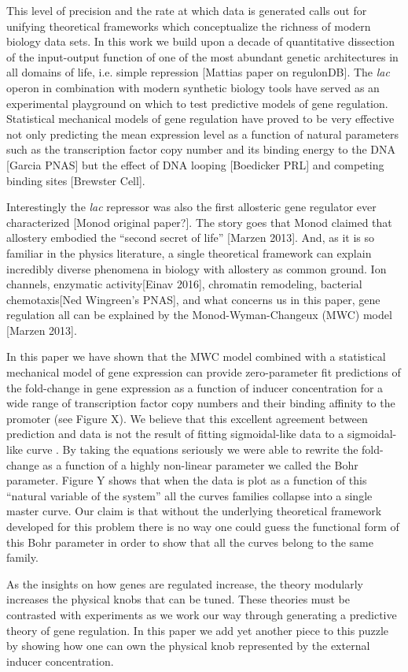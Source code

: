 This level of precision and the rate at which data is generated calls out for
unifying theoretical frameworks which conceptualize the richness of modern
biology data sets. In this work we build upon a decade of quantitative
dissection of the input-output function of one of the most abundant genetic
architectures in all domains of life, i.e. simple repression [Mattias paper on
regulonDB]. The \textit{lac} operon in combination with modern synthetic biology
tools have served as an experimental playground on which to test predictive
models of gene regulation. Statistical mechanical models of gene regulation have
proved to be very effective not only predicting the mean expression level as a
function of natural parameters such as the transcription factor copy number and
its binding energy to the DNA [Garcia PNAS] but the effect of DNA looping
[Boedicker PRL] and competing binding sites [Brewster Cell].

Interestingly the \textit{lac} repressor was also the first allosteric gene
regulator ever characterized [Monod original paper?]. The story goes that Monod
claimed that allostery embodied the ``second secret of life'' [Marzen 2013].
And, as it is so familiar in the physics literature, a single theoretical
framework can explain incredibly diverse phenomena in biology with allostery as
common ground. Ion channels, enzymatic activity[Einav 2016], chromatin
remodeling, bacterial chemotaxis[Ned Wingreen's PNAS], and what concerns us in
this paper, gene regulation all can be explained by the Monod-Wyman-Changeux
(MWC) model [Marzen 2013]. 

In this paper we have shown that the MWC model combined with a statistical
mechanical model of gene expression can provide zero-parameter fit predictions
of the fold-change in gene expression as a function of inducer concentration for
a wide range of transcription factor copy numbers and their binding affinity to
the promoter (see Figure X). We believe that this excellent agreement between
prediction and data is not the result of fitting sigmoidal-like data to a
sigmoidal-like curve . By taking the equations seriously we were able to rewrite
the fold-change as a function of a highly non-linear parameter we called the
Bohr parameter. Figure Y shows that when the data is plot as a function of this
``natural variable of the system'' all the curves families collapse into a
single master curve. Our claim is that without the underlying theoretical
framework developed for this problem there is no way one could guess the
functional form of this Bohr parameter in order to show that all the curves
belong to the same family.

As the insights on how genes are regulated increase, the theory modularly
increases the physical knobs that can be tuned. These theories must be
contrasted with experiments as we work our way through generating a predictive
theory of gene regulation. In this paper we add yet another piece to this puzzle
by showing how one can own the physical knob represented by the external inducer
concentration.
